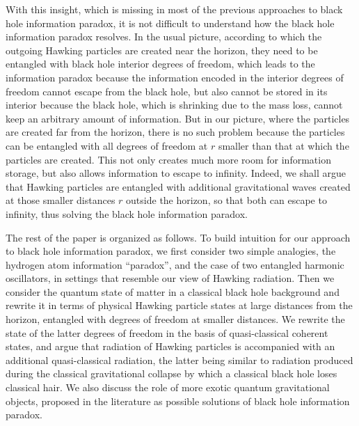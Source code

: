 \documentclass[aps,prd,onecolumn,groupedaddress,showkeys,12pt]{revtex4-2}
\begin{document}
With this insight, which is missing in most of the previous approaches to black hole information paradox, 
it is not difficult to understand 
how the black hole information paradox resolves. In the usual picture, 
according to which the outgoing Hawking particles are created near the horizon, they need to be entangled with 
black hole interior degrees of freedom, which leads to the information paradox because the information encoded in the 
interior degrees of freedom cannot escape from the black hole, but also cannot be stored in its interior because the black hole, 
which is shrinking due to the mass loss, cannot keep an arbitrary amount of information.   
But in our picture, where the particles are created far from the horizon, there is no such problem because 
the particles can be entangled with all degrees of freedom at $r$ smaller than that at which the particles are created.
This not only creates much more room for information storage, but also allows information to escape to infinity.
Indeed, we shall argue that Hawking particles are entangled with additional gravitational waves created at those smaller 
distances $r$ outside the horizon, so that both can escape to infinity, thus solving the black hole information paradox.   

The rest of the paper is organized as follows. To build intuition for our approach to black hole information paradox,
we first consider two simple analogies, 
the hydrogen atom information ``paradox'', and the case of two entangled harmonic oscillators, in settings that resemble 
our view of Hawking radiation. Then we consider the quantum state of matter in a classical black hole background and rewrite
it in terms of physical Hawking particle states at large distances from the horizon, entangled with degrees of freedom at smaller 
distances. We rewrite the state of the latter degrees of freedom in the basis of quasi-classical coherent states, 
and argue that radiation of Hawking particles is accompanied with an additional quasi-classical radiation,
the latter being similar to radiation produced during the classical gravitational collapse by which a classical black hole
loses classical hair. We also discuss the role of more exotic quantum gravitational objects, proposed in the literature
as possible solutions of black hole information paradox.      
\end{document}
